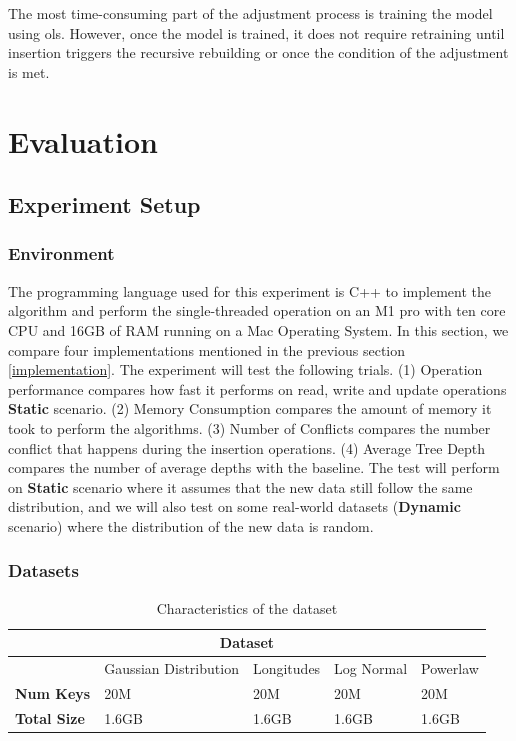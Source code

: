 \documentclass[11pt,a4paper]{article}
\newcommand{\conflict}{\textsf{conflict}\xspace}
\begin{document}
The most time-consuming part of the adjustment process is training the model using \acrshort{ols}. However, once the model is trained, it does not require retraining until insertion triggers the recursive rebuilding or once the condition of the adjustment is met. 

\section{Evaluation} \label{Evaluation}
\subsection{Experiment Setup}
\subsubsection{Environment}
The programming language used for this experiment is C++ to implement the algorithm and perform the single-threaded operation on an M1 pro with ten core CPU and 16GB of RAM running on a Mac Operating System. In this section, we compare four implementations mentioned in the previous section \ref{implementation}. 
The experiment will test the following trials. (1) Operation performance compares how fast it performs on read, write and update operations \textbf{Static} scenario. (2) Memory Consumption compares the amount of memory it took to perform the algorithms. (3) Number of Conflicts compares the number \conflict that happens during the insertion operations. (4) Average Tree Depth compares the number of average depths with the baseline. 
The test will perform on \textbf{Static} scenario where it assumes that the new data still follow the same distribution, and we will also test on some real-world datasets (\textbf{Dynamic} scenario) where the distribution of the new data is random. 
\subsubsection{Datasets}
\begin{table}
    \centering
    \begin{tabular}{ |p{2cm}|p{2cm}|p{2cm}|p{2cm}| p{2cm}|  } 
        
     \hline
     \multicolumn{5}{|c|}{Dataset} \\
     \hline
     & Gaussian Distribution & Longitudes & Log Normal & Powerlaw\\
     \hline
     \textbf{Num Keys} & 20M & 20M & 20M & 20M \\
     \textbf{Total Size} & 1.6GB & 1.6GB & 1.6GB & 1.6GB\\
     \hline
    
    \end{tabular}
     \caption{Characteristics of the dataset}
    \label{tab:characteristicdataset}
\end{table}
\end{document}
